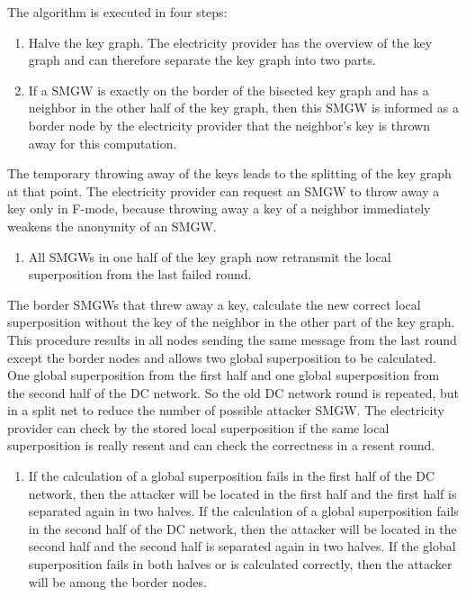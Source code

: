 The algorithm is executed in four steps:
\begin{enumerate}
\item Halve the key graph. 
The electricity provider has the overview of the key graph and can therefore separate the key graph into two parts. %
\item If a \gls{SMGW} is exactly on the border of the bisected key graph and has a neighbor in the other half of the key graph, then this \gls{SMGW} is informed as a border node by the electricity provider that the neighbor's key is thrown away for this computation.
\end{enumerate}
The temporary throwing away of the keys leads to the splitting of the key graph at that point. The electricity provider can request an \gls{SMGW} to throw away a key only in F-mode, because throwing away a key of a neighbor immediately weakens the anonymity of an \gls{SMGW}. 
\begin{enumerate}[resume] 
\item All SMGWs in one half of the key graph now retransmit the local superposition from the last failed round. 
\end{enumerate}
The border \gls{SMGW}s that threw away a key, calculate the new correct local superposition without the key of the neighbor in the other part of the key graph. This procedure results in all nodes sending the same message from the last round except the border nodes and allows two global superposition to be calculated. One global superposition from the first half and one global superposition from the second half of the DC network. So the old DC network round is repeated, but in a split net to reduce the number of possible attacker \gls{SMGW}. The electricity provider can check by the stored local superposition if the same local superposition is really resent and can check the correctness in a resent round. 
\begin{enumerate}[resume]
\item If the calculation of a global superposition fails in the first half of the DC network, then the attacker will be located in the first half and the first half is separated again in two halves. If the calculation of a global superposition fails in the second half of the DC network, then the attacker will be located in the second half and the second half is separated again in two halves. If the global superposition fails in both halves or is calculated correctly, then the attacker will be among the border nodes.
\end{enumerate}
